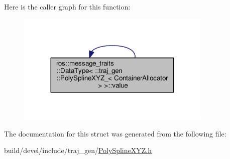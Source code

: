 Here is the caller graph for this function\+:
\nopagebreak
\begin{figure}[H]
\begin{center}
\leavevmode
\includegraphics[width=263pt]{structros_1_1message__traits_1_1_data_type_3_01_1_1traj__gen_1_1_poly_spline_x_y_z___3_01_container_allocator_01_4_01_4_aef66fdb342509b0f76cde06cca36fed6_icgraph}
\end{center}
\end{figure}




The documentation for this struct was generated from the following file\+:\begin{DoxyCompactItemize}
\item 
build/devel/include/traj\+\_\+gen/\hyperlink{_poly_spline_x_y_z_8h}{Poly\+Spline\+X\+Y\+Z.\+h}\end{DoxyCompactItemize}
